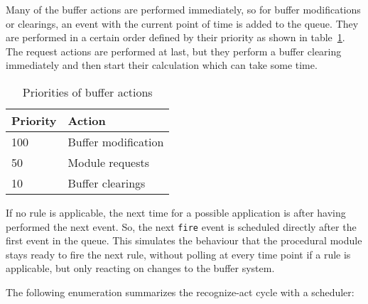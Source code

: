 Many of the buffer actions are performed immediately, so for buffer modifications or clearings, an event with the current point of time is added to the queue. They are performed in a certain order defined by their priority as shown in table~\ref{tab:action_priorities}. The request actions are performed at last, but they perform a buffer clearing immediately and then start their calculation which can take some time. 

\begin{table}[htb]
\begin{center}
\caption{Priorities of buffer actions}
\label{tab:action_priorities}
\begin{tabular}{|l|l|}
\hline
Priority & Action\\
\hline
100 & Buffer modification\\
50 & Module requests\\
10 & Buffer clearings\\
\hline
\end{tabular}
\end{center}
\end{table}


If no rule is applicable, the next time for a possible application is after having performed the next event. So, the next \lstinline|fire| event is scheduled directly after the first event in the queue. This simulates the behaviour that the procedural module stays ready to fire the next rule, without polling at every time point if a rule is applicable, but only reacting on changes to the buffer system. 

The following enumeration summarizes the recognize-act cycle with a scheduler:

